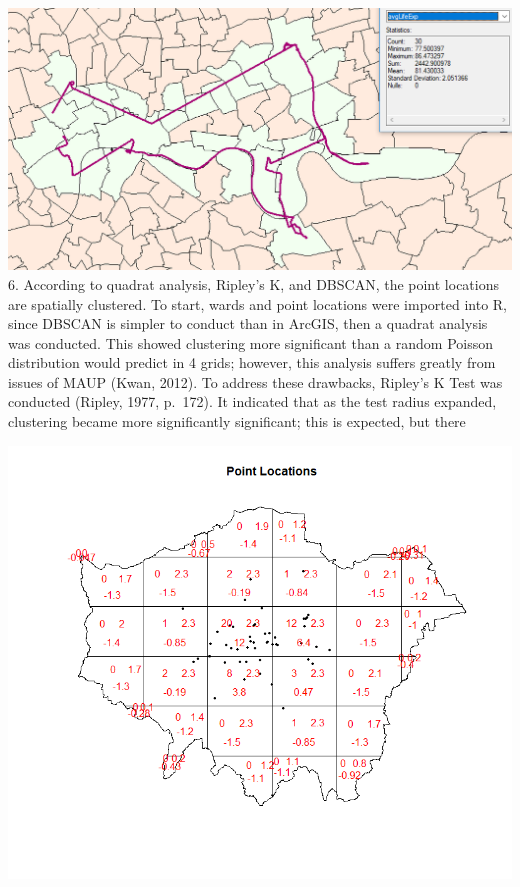 \documentclass[]{article}
\begin{document}
\includegraphics[width=24.67in]{6} 6. According to quadrat analysis,
Ripley's K, and DBSCAN, the point locations are spatially clustered. To
start, wards and point locations were imported into R, since DBSCAN is
simpler to conduct than in ArcGIS, then a quadrat analysis was
conducted. This showed clustering more significant than a random Poisson
distribution would predict in 4 grids; however, this analysis suffers
greatly from issues of MAUP (Kwan, 2012). To address these drawbacks,
Ripley's K Test was conducted (Ripley, 1977, p.~172). It indicated that
as the test radius expanded, clustering became more significantly
significant; this is expected, but there

\includegraphics[width=11.17in]{7}
\end{document}
